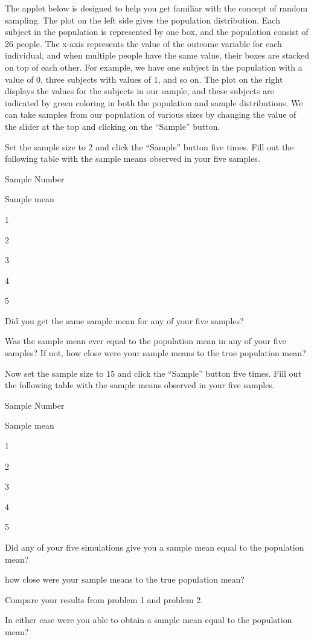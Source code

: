 \documentclass[
]{book}
\theoremstyle{definition}
\theoremstyle{definition}
\theoremstyle{definition}
\theoremstyle{remark}
\begin{document}
The applet below is designed to help you get familiar with the concept of random sampling. The plot on the left side gives the population distribution. Each subject in the population is represented by one box, and the population consist of 26 people. The x-axis represents the value of the outcome variable for each individual, and when multiple people have the same value, their boxes are stacked on top of each other. For example, we have one subject in the population with a value of 0, three subjects with values of 1, and so on. The plot on the right displays the values for the subjects in our sample, and these subjects are indicated by green coloring in both the population and sample distributions. We can take samples from our population of various sizes by changing the value of the slider at the top and clicking on the ``Sample'' button.

Set the sample size to 2 and click the ``Sample'' button five times. Fill out the following table with the sample means observed in your five samples.

Sample Number

Sample mean

1

2

3

4

5

Did you get the same sample mean for any of your five samples?

Was the sample mean ever equal to the population mean in any of your five samples? If not, how close were your sample means to the true population mean?

Now set the sample size to 15 and click the ``Sample'' button five times. Fill out the following table with the sample means observed in your five samples.

Sample Number

Sample mean

1

2

3

4

5

Did any of your five simulations give you a sample mean equal to the population mean?

how close were your sample means to the true population mean?

Compare your results from problem 1 and problem 2.

In either case were you able to obtain a sample mean equal to the population mean?
\end{document}
